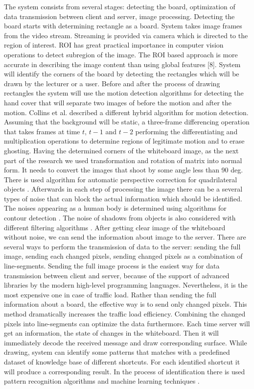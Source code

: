 The system consists from several stages: detecting the board, optimization of data transmission between client and server, image processing. Detecting the board starts with determining rectangle as a board. System takes image frames from the video stream. Streaming is provided via camera which is directed to the region of interest. ROI has great practical importance in computer vision operations to detect subregion of the image. The ROI based approach is more accurate in describing the image content than using global features [8]. System will identify the corners of the board by detecting the rectangles which will be drawn by the lecturer or a user. Before and after the process of drawing rectangles the system will use the motion detection algorithms for detecting the hand cover that will separate two images of before the motion and after the motion. Collins et al. \cite{Collins} described a different hybrid algorithm for motion detection. Assuming that the background will be static, a three-frame differencing operation that takes frames at time $t$, $t - 1$ and $t - 2$ performing the differentiating and multiplication operations to determine regions of legitimate motion and to erase ghosting.
Having the determined corners of the whiteboard image, as the next part of the research we used transformation and rotation of matrix into normal form. It needs to convert the images that shoot by some angle less than 90 deg. There is used algorithm for automatic perspective correction for quadrilateral objects \cite{Pooja}. Afterwards in each step of processing the image there can be a several types of noise that can block the actual information which should be identified. The noises appearing as a human body is determined using algorithms for contour detection \cite{Ruchika}. The noise of shadows from objects is also considered with different filtering algorithms \cite{Lin}. 
After getting clear image of the whiteboard without noise, we can send the information about image to the server. There are several ways to perform the transmission of data to the server: sending the full image, sending each changed pixels, sending changed pixels as a combination of line-segments. Sending the full image process is the easiest way for data transmission between client and server, because of the support of advanced libraries by the modern high-level programming languages. Nevertheless, it is the most expensive one in case of traffic load. \cite{Jayanta} Rather than sending the full information about a board, the effective way is to send only changed pixels. This method dramatically increases the traffic load efficiency. Combining the changed pixels into line-segments can optimize the data furthermore. Each time server will get an information, the state of changes in the whiteboard. Then it will immediately decode the received message and draw corresponding surface. While drawing, system can identify some patterns that matches with a predefined dataset of knowledge base of different shortcuts. For each identified shortcut it will produce a corresponding result. In the process of identification there is used pattern recognition algorithms and machine learning techniques \cite{Dansong}.
